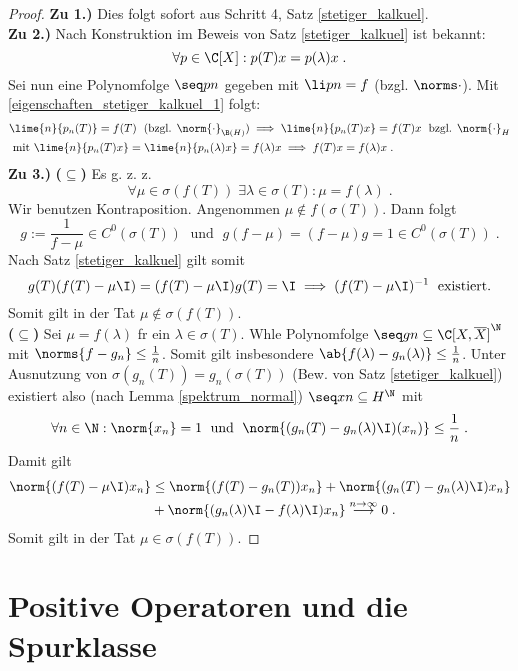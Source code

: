 	\begin{proof}
		\textbf{Zu 1.)} Dies folgt sofort aus Schritt 4, Satz \ref{stetiger_kalkuel}.\\
		\textbf{Zu 2.)} Nach Konstruktion im Beweis von Satz \ref{stetiger_kalkuel} ist bekannt:
		\[\forall p \in \C[X]: p(T)x = p(\lambda)x\;.\]
		Sei nun eine Polynomfolge \(\seq pn\) gegeben mit \(\li pn = f\) (bzgl. \(\norms\cdot\)). Mit \ref{eigenschaften_stetiger_kalkuel_1} folgt:
		\begin{align*}
		&\lime{n}{p_n(T)} = f(T)\;\text{ (bzgl. $\norm{\cdot}_{\B(H)}$)} \implies \lime{n}{p_n(T)x} = f(T)x \;\text{ bzgl. $\norm{\cdot}_{H}$} \\
		& \text{ mit }\lime{n}{p_n(T)x} = \lime{n}{p_n(\lambda)x} = f(\lambda)x \implies f(T)x = f(\lambda)x\;.
		\end{align*}
		\textbf{Zu 3.)} \textbf{($\subseteq$)} Es g. z. z. 
		\[\forall \mu \in \sigma(f(T)) \;\exists \lambda \in \sigma(T): \mu = f(\lambda)\;.\]
		Wir benutzen Kontraposition. Angenommen \(\mu \not\in f(\sigma(T))\). Dann folgt
		\[g := \frac{1}{f-\mu} \in C^0(\sigma(T)) \;\text{ und }\; g(f-\mu) = (f-\mu)g = 1 \in C^0(\sigma(T))\;.\]
		Nach Satz \ref{stetiger_kalkuel} gilt somit
		\[g(T)(f(T) -\mu\I) = (f(T) -\mu\I)g(T) = \I \implies (f(T) -\mu\I)^{-1}\;\text{ existiert.}\]
		Somit gilt in der Tat \(\mu\not\in \sigma(f(T))\).\\
		\textbf{($\subseteq$)} Sei \(\mu = f(\lambda)\) f\us r ein \(\lambda \in \sigma(T)\). W\as hle Polynomfolge \(\seq gn \subseteq \C[X,\overline X]^\N\) mit \(\norms{f - g_n} \leq \frac1n\). Somit gilt insbesondere \(\ab{f(\lambda) - g_n(\lambda)} \leq \frac 1n\). Unter Ausnutzung von \(\sigma(g_n(T)) = g_n(\sigma(T))\) (Bew. von Satz \ref{stetiger_kalkuel}) existiert also (nach Lemma \ref{spektrum_normal}) \(\seq xn \subseteq H^\N\) mit 
		\[\forall n\in\N: \norm{x_n} = 1 \;\text{ und } \; \norm{(g_n(T) - g_n(\lambda)\I)(x_n)}\leq \frac 1n\;.\]
		Damit gilt
		\begin{align*}
			\norm{(f(T) -\mu\I) x_n} &\leq \norm{(f(T) - g_n(T))x_n} + \norm{(g_n(T) - g_n(\lambda)\I)x_n} \\
			&+ \norm{(g_n(\lambda)\I - f(\lambda)\I)x_n} \overset{n\to\infty}{\longrightarrow} 0\;.
			\end{align*}
			Somit gilt in der Tat \(\mu\in\sigma(f(T))\).
	\end{proof}
	
	\section{Positive Operatoren und die Spurklasse}
	
